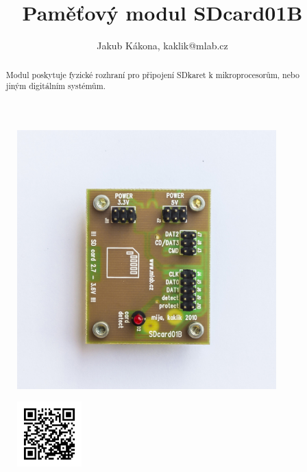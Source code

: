 \documentclass[12pt,a4paper,oneside]{article}
\begin{document}
\title{Paměťový modul SDcard01B}
\author{Jakub Kákona, kaklik@mlab.cz}
\maketitle

\thispagestyle{empty}
\begin{abstract}
Modul poskytuje fyzické rozhraní pro připojení SDkaret k mikroprocesorům, nebo jiným digitálním systémům.
\end{abstract}

\begin{figure} [htbp]
\begin{center}
\includegraphics [width=100mm] {./img/SDCARD01B_Top_Big.jpg} 
\end{center}
\end{figure}

\begin{figure} [b]
\includegraphics [width=25mm] {./img/SDcard01B_QRcode.png} 
\end{figure}

\newpage
\tableofcontents
\end{document}
